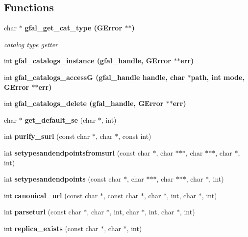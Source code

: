 \subsection*{Functions}
\begin{CompactItemize}
\item 
char $\ast$ \bf{gfal\_\-get\_\-cat\_\-type} (GError $\ast$$\ast$)
\begin{CompactList}\small\item\em catalog type getter \item\end{CompactList}\item 
int \bf{gfal\_\-catalogs\_\-instance} (gfal\_\-handle, GError $\ast$$\ast$err)
\item 
int \bf{gfal\_\-catalogs\_\-access\-G} (gfal\_\-handle handle, char $\ast$path, int mode, GError $\ast$$\ast$err)
\item 
int \bf{gfal\_\-catalogs\_\-delete} (gfal\_\-handle, GError $\ast$$\ast$err)
\item 
char $\ast$ \textbf{get\_\-default\_\-se} (char $\ast$, int)\label{gfal__common__catalog_8h_c304a754c49bedeec6c1c9b1445b937d}

\item 
int \textbf{purify\_\-surl} (const char $\ast$, char $\ast$, const int)\label{gfal__common__catalog_8h_c25d6ed82e636c14d640318a2ad5f3b5}

\item 
int \textbf{setypesandendpointsfromsurl} (const char $\ast$, char $\ast$$\ast$$\ast$, char $\ast$$\ast$$\ast$, char $\ast$, int)\label{gfal__common__catalog_8h_f398c539d03eaea6dcb6b45067cb21f2}

\item 
int \textbf{setypesandendpoints} (const char $\ast$, char $\ast$$\ast$$\ast$, char $\ast$$\ast$$\ast$, char $\ast$, int)\label{gfal__common__catalog_8h_f06de10d100ffd8ad880619661708810}

\item 
int \textbf{canonical\_\-url} (const char $\ast$, const char $\ast$, char $\ast$, int, char $\ast$, int)\label{gfal__common__catalog_8h_845c890f2d493921bd587158fab72d65}

\item 
int \textbf{parseturl} (const char $\ast$, char $\ast$, int, char $\ast$, int, char $\ast$, int)\label{gfal__common__catalog_8h_70868bce152313f31e24982453f10723}

\item 
int \textbf{replica\_\-exists} (const char $\ast$, char $\ast$, int)\label{gfal__common__catalog_8h_ac34379d44fb4037af134b34a9aae030}


\end{CompactItemize}
